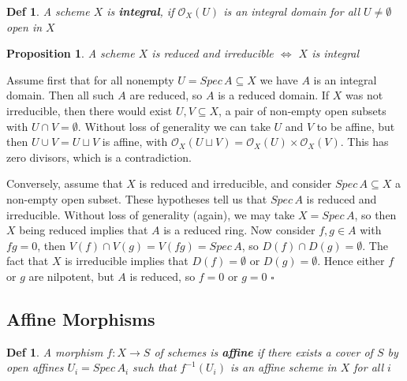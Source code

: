 \documentclass{article}
\newtheorem{definition}[theorem]{Def}
\newtheorem{proposition}[theorem]{Proposition}
\newenvironment{Proof}{{\noindent \indent \it Proof:\quad}}{\hfill $\square$\par}
\begin{document}
\begin{definition}
    A scheme $X$ is \textbf{integral}, if $\mathcal O_X(U)$ is an integral domain for all $U \ne \emptyset$ open in $X$
\end{definition}

\begin{proposition}
    A scheme $X$ is reduced and irreducible $\Leftrightarrow$ $X$ is integral
\end{proposition}
\begin{Proof}
    Assume first that for all nonempty $U = Spec\, A \subseteq X$ we have $A$ is an integral domain. Then all such $A$ are reduced, so $A$ is a reduced domain. If $X$ was not irreducible, then there would exist $U, V \subseteq X$, a pair of non-empty open subsets with $U \cap V = \emptyset$. Without loss of generality we can take $U$ and $V$ to be affine, but then $U \cup V = U \sqcup V$ is affine, with $\mathcal O_X(U \sqcup V) = \mathcal O_X(U)\times \mathcal O_X(V)$. This has zero divisors, which is a contradiction.
    
Conversely, assume that $X$ is reduced and irreducible, and consider
$Spec\, A \subseteq X$ a non-empty open subset. These hypotheses tell us that $Spec\, A$ is reduced and irreducible.
Without loss of generality (again), we may take $X = Spec\, A$, so then $X$ being reduced implies that
$A$ is a reduced ring. Now consider $f, g \in A$ with $fg = 0$, then $V (f) \cap V (g) = V (fg) = Spec\, A$, so
$D(f) \cap D(g) = \emptyset$. The fact that $X$ is irreducible implies that $D(f) = \emptyset$ or $D(g) = \emptyset$. Hence either $f$ or $g$ are nilpotent, but $A$ is reduced, so $f = 0$ or $g = 0$
\end{Proof}

\newpage
\subsection{Affine Morphisms}

\begin{definition}
    A morphism $f : X \to S$ of schemes is \textbf{affine} if there exists a cover of $S$ by open affines $U_i=Spec\,A_i$ such that $f^{-1}(U_i)$ is an affine scheme in $X$ for all $i$
\end{definition}
\end{document}
